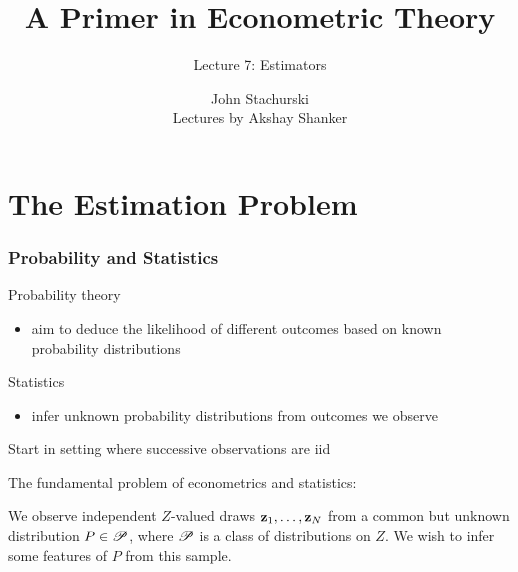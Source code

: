 




\title{A Primer in Econometric Theory}

\subtitle
{Lecture 7: Estimators}

\author{John Stachurski \\ \tiny Lectures by Akshay Shanker}




\begin{frame}
  \titlepage
\end{frame}

\section{The Estimation Problem}

\begin{frame}\frametitle{Probability and Statistics}
    
    \vspace{2em}
    Probability theory
        \begin{itemize}
            \item aim to deduce the likelihood of different
        outcomes based on known probability distributions
        \end{itemize}
    
    \vspace{.7em}    
    Statistics
        \begin{itemize}
            \item infer unknown probability distributions from outcomes we
            observe
        \end{itemize}

\end{frame}

\begin{frame}
    
    \vspace{2em}
    Start in setting where successive observations are {\sc iid}
    
    \vspace{.7em}
    The fundamental problem of econometrics and statistics:
    
    \begin{problem}
        We observe independent $Z$-valued draws ${\mathbf z}_1, \ldots, {\mathbf z}_N$ 
        from a common but
        unknown distribution $P \in \mathscr P$, where $\mathscr P$ is a class of distributions
        on $Z$.   We wish to infer some features of $P$ from this sample.
    \end{problem}
    
\end{frame}

